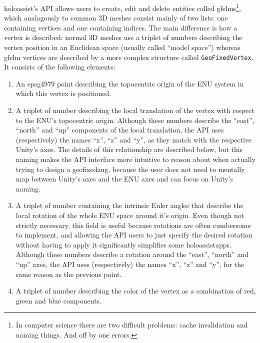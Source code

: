 \gls{holoassist}'s \gls{API} allows users to create, edit and delete entities called \glspl{gfelm}\footnote{In computer science there are two difficult problems: cache invalidation and naming things. And off by one errors\cite{karlton_twohardthings_nodate}.}, which analogously to common 3D meshes consist mainly of two lists: one containing vertices and one containing indices. The main difference is how a vertex is described: normal 3D meshes use a triplet of numbers describing the vertex position in an Euclidean space (usually called \enquote{model space}) whereas \gls{gfelm} vertices are described by a more complex structure called \texttt{GeoFixedVertex}. It consists of the following elements:
\begin{enumerate}
    \item An \gls{epsg4979} point describing the topocentric origin of the \gls{ENU} system in which this vertex is positioned.
    \item A triplet of number describing the local translation of the vertex with respect to the \gls{ENU}'s topocentric origin. Although these numbers describe the \enquote{east}, \enquote{north} and \enquote{up} components of the local translation, the \gls{API} uses (respectively) the names \enquote{x}, \enquote{z} and \enquote{y}, as they match with the respective Unity's axes. The details of this relationship are described below, but this naming makes the \gls{API} interface more intuitive to reason about when actually trying to design a \gls{geofixedaug}, because the user does not need to mentally map between Unity's axes and the \gls{ENU} axes and can focus on Unity's naming.
    \item A triplet of number containing the intrinsic Euler angles that describe the local rotation of the whole \gls{ENU} space around it's origin. Even though not strictly necessary, this field is useful because rotations are often cumbersome to implement, and allowing the \gls{API} users to just specify the desired rotation without having to apply it significantly simplifies some \glspl{holoassistapp}. Although these numbers describe a rotation around the \enquote{east}, \enquote{north} and \enquote{up} axes, the \gls{API} uses (respectively) the names \enquote{x}, \enquote{z} and \enquote{y}, for the same reason as the previous point.
    \item A triplet of number describing the color of the vertex as a combination of red, green and blue components.
\end{enumerate}

